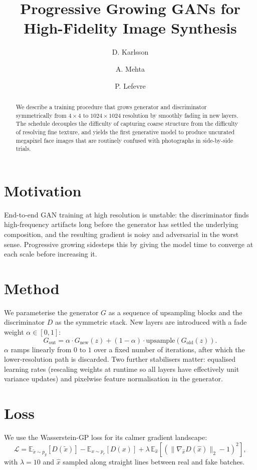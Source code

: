 \documentclass[11pt]{article}
\title{Progressive Growing GANs for High-Fidelity Image Synthesis}
\author{D. Karlsson \and A. Mehta \and P. Lefevre}
\date{}
\begin{document}
\maketitle

\begin{abstract}
We describe a training procedure that grows generator and discriminator
symmetrically from $4\times4$ to $1024\times1024$ resolution by smoothly
fading in new layers. The schedule decouples the difficulty of capturing
coarse structure from the difficulty of resolving fine texture, and yields
the first generative model to produce uncurated megapixel face images that
are routinely confused with photographs in side-by-side trials.
\end{abstract}

\section{Motivation}
End-to-end GAN training at high resolution is unstable: the discriminator
finds high-frequency artifacts long before the generator has settled the
underlying composition, and the resulting gradient is noisy and adversarial
in the worst sense. Progressive growing sidesteps this by giving the model
time to converge at each scale before increasing it.

\section{Method}
We parameterise the generator $G$ as a sequence of upsampling blocks and the
discriminator $D$ as the symmetric stack. New layers are introduced with a
fade weight $\alpha \in [0, 1]$:
\begin{equation}
G_\text{out} = \alpha \cdot G_\text{new}(z) + (1 - \alpha) \cdot
\mathrm{upsample}(G_\text{old}(z)).
\end{equation}
$\alpha$ ramps linearly from $0$ to $1$ over a fixed number of iterations,
after which the lower-resolution path is discarded. Two further stabilisers
matter: equalised learning rates (rescaling weights at runtime so all layers
have effectively unit variance updates) and pixelwise feature normalisation
in the generator.

\section{Loss}
We use the Wasserstein-GP loss for its calmer gradient landscape:
\begin{equation}
\mathcal{L} = \mathbb{E}_{\tilde{x} \sim p_g}[D(\tilde{x})] -
              \mathbb{E}_{x \sim p_r}[D(x)] +
              \lambda \, \mathbb{E}_{\hat{x}}\!\left[(\|\nabla_{\hat{x}} D(\hat{x})\|_2 - 1)^2 \right],
\end{equation}
with $\lambda = 10$ and $\hat{x}$ sampled along straight lines between real
and fake batches.
\end{document}
